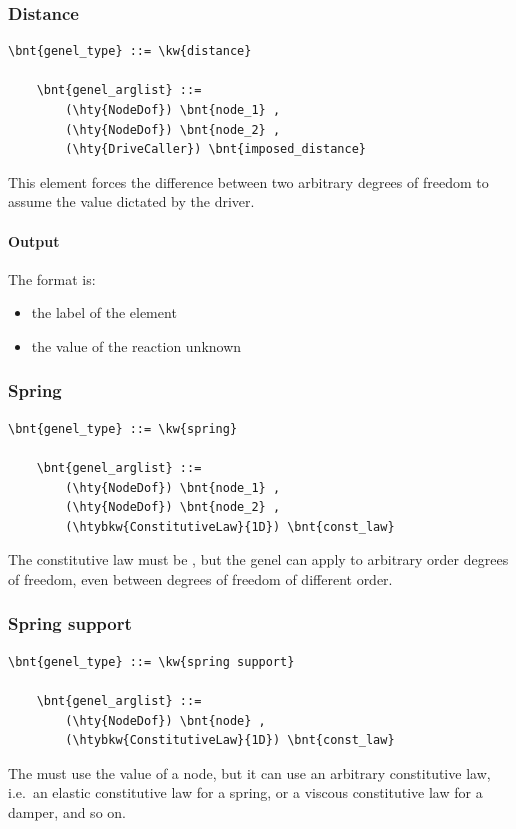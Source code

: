 \subsubsection{Distance}
\label{sec:EL:GENEL:DISTANCE}
\begin{Verbatim}[commandchars=\\\{\}]
    \bnt{genel_type} ::= \kw{distance}

    \bnt{genel_arglist} ::=
        (\hty{NodeDof}) \bnt{node_1} ,
        (\hty{NodeDof}) \bnt{node_2} ,
        (\hty{DriveCaller}) \bnt{imposed_distance}
\end{Verbatim}
This element forces the difference between two arbitrary degrees of freedom
to assume the value dictated by the driver.

\paragraph{Output}
The format is:
\begin{itemize}
    \item the label of the element
    \item the value of the reaction unknown
\end{itemize}
  
\subsubsection{Spring}
\label{sec:EL:GENEL:SPRING}
\begin{Verbatim}[commandchars=\\\{\}]
    \bnt{genel_type} ::= \kw{spring}

    \bnt{genel_arglist} ::=
        (\hty{NodeDof}) \bnt{node_1} ,
        (\hty{NodeDof}) \bnt{node_2} ,
        (\htybkw{ConstitutiveLaw}{1D}) \bnt{const_law}
\end{Verbatim}
The constitutive law must be , but the 
genel can apply to arbitrary order degrees of freedom, even between degrees 
of freedom of different order.

\subsubsection{Spring support}
\label{sec:EL:GENEL:SPRING-SUPPORT}
\begin{Verbatim}[commandchars=\\\{\}]
    \bnt{genel_type} ::= \kw{spring support}

    \bnt{genel_arglist} ::=
        (\hty{NodeDof}) \bnt{node} ,
        (\htybkw{ConstitutiveLaw}{1D}) \bnt{const_law}
\end{Verbatim}
The  must use the  value of a 
 node, but it can use an arbitrary constitutive law,
i.e.\ an elastic constitutive law for a spring, or a viscous
constitutive law for a damper, and so on.

